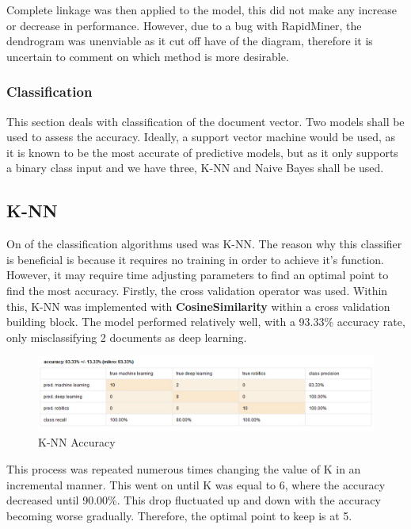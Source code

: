 Complete linkage was then applied to the model, this did not make any increase or decrease in performance. However, due to a bug with RapidMiner, the dendrogram was unenviable as it cut off have of the diagram, therefore it is uncertain to comment on which method is more desirable. 



\subsubsection*{Classification}
This section deals with classification of the document vector. Two models shall be used to assess the accuracy. Ideally, a support vector machine would be used, as it is known to be the most accurate of predictive models, but as it only supports a binary class input and we have three, K-NN and Naive Bayes shall be used.
\subsection*{K-NN}
On of the classification algorithms used was K-NN. The reason why this classifier is beneficial is because it requires no training in order to achieve it's function. However, it may require time adjusting parameters to find an optimal point to find the most accuracy.
Firstly, the cross validation operator was used. Within this, K-NN was implemented with \textbf{CosineSimilarity} within a cross validation building block. The model performed relatively well, with a 93.33\% accuracy rate, only misclassifying 2 documents as deep learning.


\begin{figure}[ht]
	\begin{center}
		\advance\leftskip-3cm
		\advance\rightskip-3cm
		\includegraphics[keepaspectratio=true,scale=0.7]{__resources/knn1.JPG}
		\caption{K-NN Accuracy}
		\label{stop}
	\end{center}
\end{figure} 

This process was repeated numerous times changing the value of K in an incremental manner. This went on until K was equal to 6, where the accuracy decreased until 90.00\%. This drop fluctuated up and down with the accuracy becoming worse gradually. Therefore, the optimal point to keep is at 5. 

